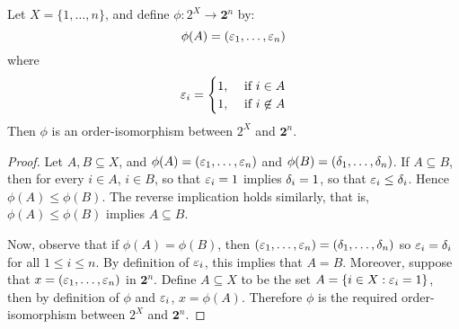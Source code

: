 \begin{proposition}\label{proposition_1.5.6}
  Let $X=\{1, \dots, n\}$, and define $\phi:2^X \xrightarrow{}
  \mathbf{2}^n$ by:
  \begin{equation*}
    \phi(A)=(\varepsilon_1, \dots, \varepsilon_n)
  \end{equation*}
  where
  \begin{equation*}
    \varepsilon_i=
    \begin{cases}
      1, &  \text{ if } i \in A \\
      1, &  \text{ if } i \not\in A \\
    \end{cases}
  \end{equation*}
  Then $\phi$ is an order-isomorphism between $2^X$ and
  $\mathbf{2}^n$.
\end{proposition}
\begin{proof}
  Let $A, B \subseteq X$, and $\phi(A)=(\varepsilon_1, \dots, \varepsilon_n)$ and
  $\phi(B)=(\delta_1, \dots, \delta_n)$. If $A \subseteq B$, then for every $i
  \in A$, $i \in B$, so that $\varepsilon_i=1$ implies  $\delta_i=1$, so that
  $\varepsilon_i \leq \delta_i$. Hence $\phi(A) \leq \phi(B)$. The reverse
  implication holds similarly, that is, $\phi(A) \leq \phi(B)$ implies
  $A \subseteq B$.

  Now, observe that if $\phi(A)=\phi(B)$, then $(\varepsilon_1, \dots,
  \varepsilon_n)=(\delta_1, \dots ,\delta_n)$ so $\varepsilon_i=\delta_i$ for  all $1 \leq i \leq
  n$. By definition of $\varepsilon_i$, this implies that $A=B$. Moreover,
  suppose that $x=(\varepsilon_1, \dots, \varepsilon_n)$ in $\mathbf{2}^n$. Define $A
  \subseteq X$ to be the set $A=\{i \in X : \varepsilon_i=1\}$, then by
  definition of $\phi$ and $\varepsilon_i$, $x=\phi(A)$. Therefore $\phi$ is
  the required order-isomorphism between $2^X$ and $\mathbf{2}^n$.
\end{proof}
